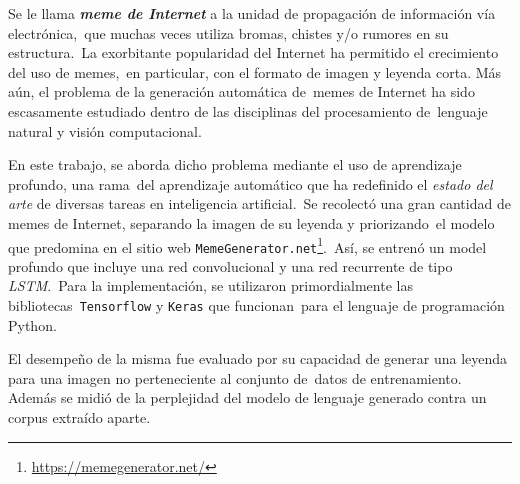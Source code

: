 \documentclass[letter]{book}
\begin{document}
\noindent
Se le llama \emph{\textbf{meme de Internet}} a la unidad de propagación de información vía electrónica,\
que muchas veces utiliza bromas, chistes y/o rumores en su estructura\cite{shifman2014}.\
La exorbitante popularidad del Internet ha permitido el crecimiento del uso de memes,\
en particular, con el formato de imagen y leyenda corta. Más aún, el problema de la generación automática de\
memes de Internet ha sido escasamente estudiado dentro de las disciplinas del procesamiento de\
lenguaje natural y visión computacional.\par
\noindent
En este trabajo, se aborda dicho problema mediante el uso de aprendizaje profundo, una rama\
del aprendizaje automático que ha redefinido el \emph{estado del arte} de diversas tareas en inteligencia artificial.\
Se recolectó una gran cantidad de memes de Internet, separando la imagen de su leyenda y priorizando\
el modelo que predomina en el sitio web \texttt{MemeGenerator.net}\footnote{\url{https://memegenerator.net/}}.\
Así, se entrenó un model profundo que incluye una red convolucional y una red recurrente de tipo \emph{LSTM}.\
Para la implementación, se utilizaron primordialmente las bibliotecas\
\texttt{Tensorflow}\cite{tensorflow2015-whitepaper} y \texttt{Keras}\cite{chollet2015keras} que funcionan\
para el lenguaje de programación Python.\par
\noindent
El desempeño de la misma fue evaluado por su capacidad de generar una leyenda para una imagen no perteneciente al conjunto de\
datos de entrenamiento. Además se midió de la perplejidad del modelo de lenguaje generado contra un corpus extraído aparte.\par
\end{document}
